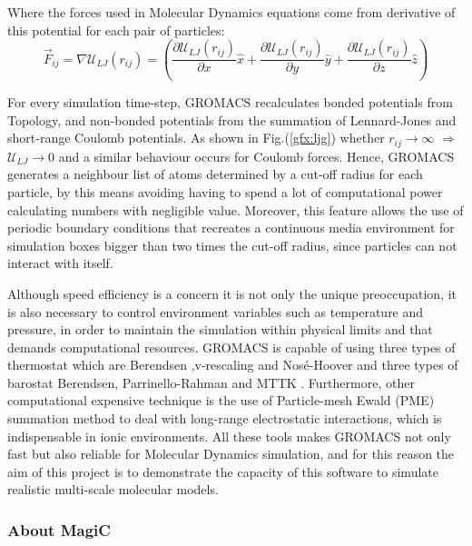 \documentclass[10pt,a4paper,twoside]{article}
\begin{document}
Where the forces used in Molecular Dynamics equations come from derivative of this potential for each pair of particles:
\begin{equation}
\vec{F}_{ij} = \nabla\mathcal{U}_{LJ}(r_{ij}) = \left( \dfrac{\partial\mathcal{U}_{LJ}(r_{ij})}{\partial x}\hat{x} + \dfrac{\partial\mathcal{U}_{LJ}(r_{ij})}{\partial y}\hat{y}+\dfrac{\partial\mathcal{U}_{LJ}(r_{ij})}{\partial z}\hat{z}\right) 
\label{eqn:ljf}
\end{equation}

For every simulation time-step, GROMACS recalculates bonded potentials from Topology, and non-bonded potentials from the summation of Lennard-Jones and short-range Coulomb potentials. As shown in Fig.(\ref{gfx:ljg}) whether $r_{ij} \rightarrow \infty$ $\Rightarrow$ $\mathcal{U}_{LJ} \rightarrow 0$ and a similar behaviour occurs for Coulomb forces. Hence, GROMACS generates a neighbour list of atoms determined by a cut-off radius for each particle, by this means avoiding having to spend a lot of computational power calculating numbers with negligible value. Moreover, this feature allows the use of periodic boundary conditions that recreates a continuous media environment for simulation boxes bigger than  two times the cut-off radius, since particles can not interact with itself. 

Although speed efficiency is a concern it is not only the unique preoccupation, it is also necessary to control environment variables such as     temperature and pressure, in order to maintain the simulation within physical limits and that demands computational resources. GROMACS is capable of using three types of thermostat which are Berendsen ,v-rescaling and Nosé-Hoover  and three types of barostat Berendsen, Parrinello-Rahman and MTTK \cite{gromanual}. Furthermore, other computational expensive technique is the use of Particle-mesh Ewald (PME) summation method to deal with long-range electrostatic interactions, which is indispensable in ionic environments. All these tools makes GROMACS not only fast but also reliable for Molecular Dynamics simulation, and for this reason the aim of this project is to demonstrate the capacity of this software to simulate realistic multi-scale molecular models.
  
\subsubsection*{About MagiC}
\end{document}

